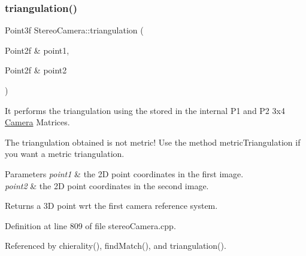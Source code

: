 \subsubsection{\texorpdfstring{triangulation()}{triangulation()}\hspace{0.1cm}{\footnotesize\ttfamily [1/2]}}
{\footnotesize\ttfamily Point3f Stereo\+Camera\+::triangulation (\begin{DoxyParamCaption}\item[{Point2f \&}]{point1,  }\item[{Point2f \&}]{point2 }\end{DoxyParamCaption})}



It performs the triangulation using the stored in the internal P1 and P2 3x4 \hyperlink{classCamera}{Camera} Matrices. 

The triangulation obtained is not metric! Use the method metric\+Triangulation if you want a metric triangulation. 
\begin{DoxyParams}{Parameters}
{\em point1} & the 2D point coordinates in the first image. \\
\hline
{\em point2} & the 2D point coordinates in the second image. \\
\hline
\end{DoxyParams}
\begin{DoxyReturn}{Returns}
a 3D point wrt the first camera reference system. 
\end{DoxyReturn}


Definition at line 809 of file stereo\+Camera.\+cpp.



Referenced by chierality(), find\+Match(), and triangulation().


